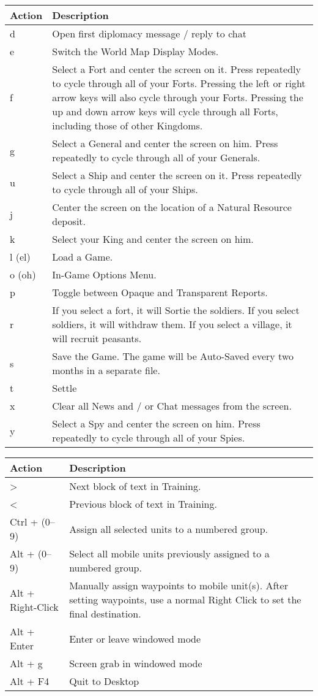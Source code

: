 \begin{tabular}{ | l | p{10cm} |}
	\hline	 	
	Action	& Description \\ \hline
	d	& Open first diplomacy message / reply to chat \\ \hline
	e	& Switch the World Map Display Modes. \\ \hline
	f	& Select a Fort and center the screen on it. Press repeatedly to cycle through all of your Forts. Pressing the left or right arrow keys will also cycle through your Forts. Pressing the up and down arrow keys will cycle through all Forts, including those of other Kingdoms. \\ \hline
	g	& Select a General and center the screen on him. Press repeatedly to cycle through all of your Generals. \\ \hline
	u	& Select a Ship and center the screen on it. Press repeatedly to cycle through all of your Ships. \\ \hline
	j	& Center the screen on the location of a Natural Resource deposit. \\ \hline
	k	& Select your King and center the screen on him. \\ \hline
	l (el)	& Load a Game. \\ \hline
	o (oh)	& In-Game Options Menu. \\ \hline
	p	& Toggle between Opaque and Transparent Reports. \\ \hline
	r	& If you select a fort, it will Sortie the soldiers. If you select soldiers, it will withdraw them. If you select a village, it will recruit peasants. \\ \hline
	s	& Save the Game. The game will be Auto-Saved every two months in a separate file. \\ \hline
	t	& Settle \\ \hline
	x	& Clear all News and / or Chat messages from the screen. \\ \hline
	y	& Select a Spy and center the screen on him. Press repeatedly to cycle through all of your Spies. \\ \hline
\end{tabular}
	
	\begin{tabular}{ | l | p{6cm} |}
		\hline	 
		Action	& Description \\ \hline
	\textgreater & Next block of text in Training. \\ \hline
	\textless	& Previous block of text in Training. \\ \hline
	Ctrl + (0--9)	& Assign all selected units to a numbered group. \\ \hline
	Alt + (0--9)	& Select all mobile units previously assigned to a numbered group. \\ \hline
	Alt + Right-Click	& Manually assign waypoints to mobile unit(s). After setting waypoints, use a normal Right Click to set the final destination. \\ \hline
	Alt + Enter & Enter or leave windowed mode \\ \hline
	Alt + g & Screen grab in windowed mode \\ \hline
	Alt + F4	& Quit to Desktop \\ \hline
		\hline
\end{tabular}


